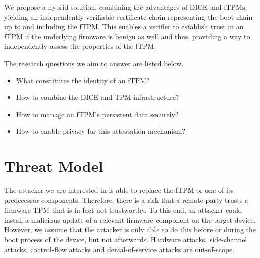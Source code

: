 
We propose a hybrid solution, combining the advantages of \ac{DICE} and \acp{fTPM}, yielding an independently verifiable certificate chain representing the boot chain up to and including the \ac{fTPM}.
This enables a verifier to establish trust in an \ac{fTPM} if the underlying firmware is benign as well and thus, providing a way to independently assess the properties of the \ac{fTPM}.


The research questions we aim to answer are listed below.
\begin{itemize}
  \item What constitutes the identity of an fTPM\@? %
  \item How to combine the DICE and TPM infrastructure? %
  \item How to manage an fTPM's persistent data securely? %
  \item How to enable privacy for this attestation mechanism?
\end{itemize}



\section{Threat Model}



The attacker we are interested in is able to replace the fTPM or one of its predecessor components.
Therefore, there is a risk that a remote party trusts a firmware TPM that is in fact not trustworthy.
To this end, an attacker could install a malicious update of a relevant firmware component on the target device.
However, we assume that the attacker is only able to do this before or during the boot process of the device, but not afterwards.
Hardware attacks, side-channel attacks, control-flow attacks and denial-of-service attacks are out-of-scope.

